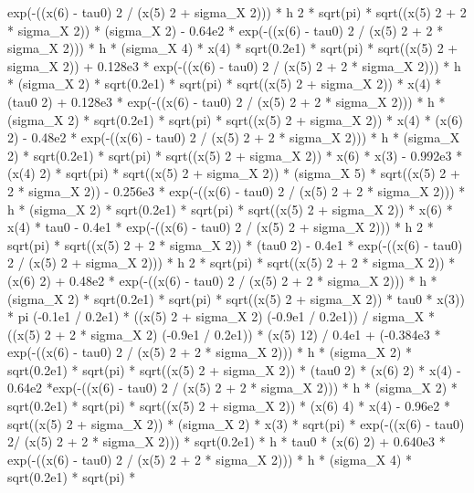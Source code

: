 \begin{maplegroup}
exp(-((x(6) - tau0)  2 / (x(5)  2 + sigma\_X  2))) * h  2 * sqrt(pi) * sqrt((x(5)  2 + 2 * sigma\_X  2)) * (sigma\_X  2) - 0.64e2 * exp(-((x(6) - tau0)  2 / (x(5)  2 + 2 * sigma\_X  2))) * h * (sigma\_X  4) * x(4) * sqrt(0.2e1) * sqrt(pi) * sqrt((x(5)  2 + sigma\_X  2)) + 0.128e3 * exp(-((x(6) - tau0)  2 / (x(5)  2 + 2 * sigma\_X  2))) * h * (sigma\_X  2) * sqrt(0.2e1) * sqrt(pi) * sqrt((x(5)  2 + sigma\_X  2)) * x(4) * (tau0  2) + 0.128e3 * exp(-((x(6) - tau0)  2 / (x(5)  2 + 2 * sigma\_X  2))) * h * (sigma\_X  2) * sqrt(0.2e1) * sqrt(pi) * sqrt((x(5)  2 + sigma\_X  2)) * x(4) * (x(6)  2) - 0.48e2 * exp(-((x(6) - tau0)  2 / (x(5)  2 + 2 * sigma\_X  2))) * h * (sigma\_X  2) * sqrt(0.2e1) * sqrt(pi) * sqrt((x(5)  2 + sigma\_X  2)) * x(6) * x(3) - 0.992e3 * (x(4)  2) * sqrt(pi) * sqrt((x(5)  2 + sigma\_X  2)) * (sigma\_X  5) * sqrt((x(5)  2 + 2 * sigma\_X  2)) - 0.256e3 * exp(-((x(6) - tau0)  2 / (x(5)  2 + 2 * sigma\_X  2))) * h * (sigma\_X  2) * sqrt(0.2e1) * sqrt(pi) * sqrt((x(5)  2 + sigma\_X  2)) * x(6) * x(4) * tau0 - 0.4e1 * exp(-((x(6) - tau0)  2 / (x(5)  2 + sigma\_X  2))) * h  2 * sqrt(pi) * sqrt((x(5)  2 + 2 * sigma\_X  2)) * (tau0  2) - 0.4e1 * exp(-((x(6) - tau0)  2 / (x(5)  2 + sigma\_X  2))) * h  2 * sqrt(pi) * sqrt((x(5)  2 + 2 * sigma\_X  2)) * (x(6)  2) + 0.48e2 * exp(-((x(6) - tau0)  2 / (x(5)  2 + 2 * sigma\_X  2))) * h * (sigma\_X  2) * sqrt(0.2e1) * sqrt(pi) * sqrt((x(5)  2 + sigma\_X  2)) * tau0 * x(3)) * pi  (-0.1e1 / 0.2e1) * ((x(5)  2 + sigma\_X  2)  (-0.9e1 / 0.2e1)) / sigma\_X * ((x(5) 2 + 2 * sigma\_X  2)  (-0.9e1 / 0.2e1)) * (x(5)  12) / 0.4e1 + (-0.384e3 * exp(-((x(6) - tau0)  2 / (x(5)  2 + 2 * sigma\_X  2))) * h * (sigma\_X  2) * sqrt(0.2e1) * sqrt(pi) * sqrt((x(5)  2 + sigma\_X  2)) * (tau0  2) * (x(6)  2) * x(4) - 0.64e2 *exp(-((x(6) - tau0)  2 / (x(5)  2 + 2 * sigma\_X  2))) * h * (sigma\_X  2) * sqrt(0.2e1) * sqrt(pi) * sqrt((x(5)  2 + sigma\_X  2)) * (x(6)  4) * x(4) - 0.96e2 * sqrt((x(5)  2 + sigma\_X  2)) * (sigma\_X  2) * x(3) * sqrt(pi) * exp(-((x(6) - tau0)  2/ (x(5)  2 + 2 * sigma\_X  2))) * sqrt(0.2e1) * h * tau0 * (x(6)  2) + 0.640e3 * exp(-((x(6) - tau0)  2 / (x(5)  2 + 2 * sigma\_X  2))) * h * (sigma\_X  4) * sqrt(0.2e1) * sqrt(pi) * 
\end{maplegroup}
